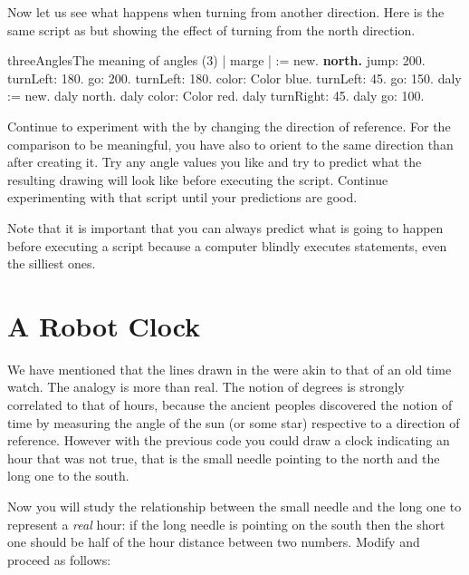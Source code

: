 \begin{exonofig} 
Now let us see what happens when turning from another direction.  Here
is the same script as  but showing the
effect of turning from the north direction.

\begin{scriptfig}{threeAngles}{The meaning of angles (3)} 
\label{scr:angleSearch3}
| \caro marge |
\caro := \Turtle new.
\textbf{\caro north.}
\caro jump: 200.
\caro turnLeft: 180.
\caro go: 200.
\caro turnLeft: 180.
\caro color: Color blue.
\caro turnLeft: 45.
\caro go: 150.
daly := \Turtle new.
daly north.
daly color: Color red.
daly turnRight: 45.
daly go: 100.
\end{scriptfig}
\end{exonofig} 

\begin{exonofig}
Continue to experiment with the  by changing
the direction of reference. For the comparison to be meaningful, you
have also to orient  to the same direction than \caro after
creating it. Try any angle values you like and try to predict what the
resulting drawing will look like before executing the script. Continue
experimenting with that script until your predictions are good.
\end{exonofig}

Note that it is important that you can always predict what is going to happen
before executing a script because a computer blindly executes statements, even the silliest ones.


\section{A Robot Clock}
We have mentioned that the lines drawn in the 
were akin to that of an old time watch. The analogy is more than
real. The notion of degrees is strongly correlated to that of hours,
because the ancient peoples discovered the notion of time by measuring the
angle of the sun (or some star) respective to a direction of reference.
However with the previous code you could draw a clock indicating an hour that was not true, that is the small needle pointing to the north and the long one to the south. 

Now you will study the relationship between the small needle and the long one to represent a \emph{real} hour: if the long needle is pointing on the south then the short one should be half of the hour distance between two numbers. Modify  and proceed as follows:

